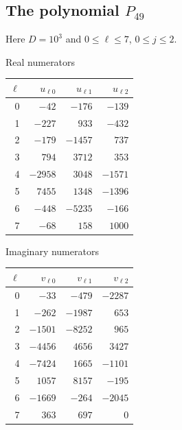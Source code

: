 \documentclass[UTF8,11pt]{ctexart}
\theoremstyle{definition}
\numberwithin{equation}{section}
\begin{document}
\subsection*{The polynomial \texorpdfstring{$P_{49}$}{P49}}
Here $D=10^3$ and $0\le\ell\le 7$, $0\le j\le2$.

\begin{center}
\begin{minipage}{\textwidth}\centering
\small
Real numerators
\smallskip

\begin{tabular}{rrrr}
\toprule
$\ell$ & $u_{\ell0}$ & $u_{\ell1}$ & $u_{\ell2}$ \\
\midrule
0 & $-42$ & $-176$ & $-139$ \\
1 & $-227$ & $933$ & $-432$ \\
2 & $-179$ & $-1457$ & $737$ \\
3 & $794$ & $3712$ & $353$ \\
4 & $-2958$ & $3048$ & $-1571$ \\
5 & $7455$ & $1348$ & $-1396$ \\
6 & $-448$ & $-5235$ & $-166$ \\
7 & $-68$ & $158$ & $1000$ \\
\bottomrule
\end{tabular}
\end{minipage}
\end{center}

\begin{center}
\begin{minipage}{\textwidth}\centering
\small
Imaginary numerators
\smallskip

\begin{tabular}{rrrr}
\toprule
$\ell$ & $v_{\ell0}$ & $v_{\ell1}$ & $v_{\ell2}$ \\
\midrule
0 & $-33$ & $-479$ & $-2287$ \\
1 & $-262$ & $-1987$ & $653$ \\
2 & $-1501$ & $-8252$ & $965$ \\
3 & $-4456$ & $4656$ & $3427$ \\
4 & $-7424$ & $1665$ & $-1101$ \\
5 & $1057$ & $8157$ & $-195$ \\
6 & $-1669$ & $-264$ & $-2045$ \\
7 & $363$ & $697$ & $0$ \\
\bottomrule
\end{tabular}
\end{minipage}
\end{center}
\end{document}
